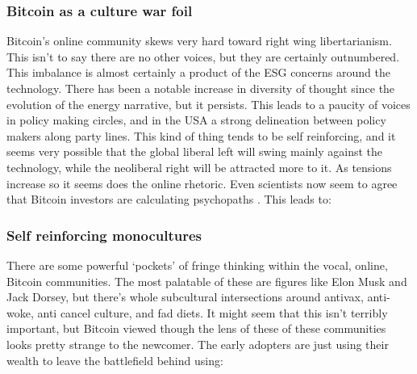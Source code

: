 \subsubsection{Bitcoin as a culture war foil}
Bitcoin's online community skews very hard toward right wing libertarianism. This isn't to say there are no other voices, but they are certainly outnumbered. This imbalance is almost certainly a product of the ESG concerns around the technology. There has been a notable increase in diversity of thought since the evolution of the energy narrative, but it persists. This leads to a paucity of voices in policy making circles, and in the USA a strong delineation between policy makers along party lines. This kind of thing tends to be self reinforcing, and it seems very possible that the global liberal left will swing mainly against the technology, while the neoliberal right will be attracted more to it. As tensions increase so it seems does the online rhetoric. Even scientists now seem to agree that Bitcoin investors are calculating psychopaths \cite{martin2022dark}. This leads to:
\subsubsection{Self reinforcing monocultures}
There are some powerful `pockets' of fringe thinking within the vocal, online, Bitcoin communities. The most palatable of these are figures like Elon Musk and Jack Dorsey, but there's whole subcultural intersections around antivax, anti-woke, anti cancel culture, and fad diets. It might seem that this isn't terribly important, but Bitcoin viewed though the lens of these of these communities looks pretty strange to the newcomer. The early adopters are just using their wealth to leave the battlefield behind using:
